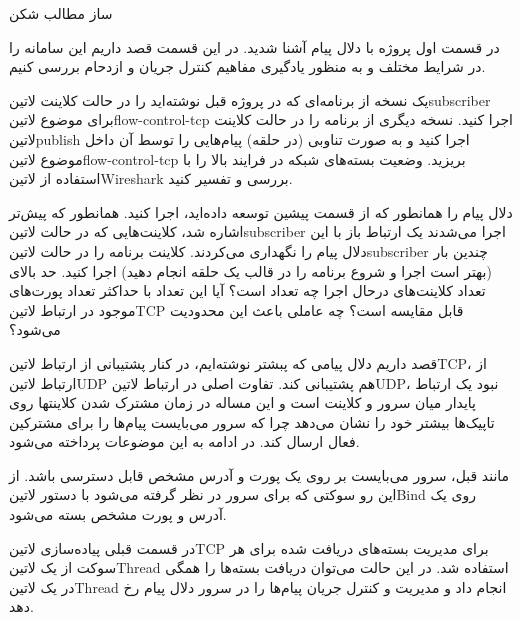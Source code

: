 \documentclass[]{article}
\begin{document}
  ‌ساز
  ‌مطالب
  ‌شکن


  در قسمت اول پروژه با دلال پیام آشنا شدید. در این قسمت قصد داریم این سامانه را در شرایط مختلف
  و به منظور یادگیری مفاهیم کنترل جریان و ازدحام بررسی کنیم.


   یک نسخه از برنامه‌ای که در پروژه قبل نوشته‌اید را در حالت کلاینت ‌لاتین{subscriber} برای موضوع ‌لاتین{flow-control-tcp} اجرا کنید.
   نسخه دیگری از برنامه را در حالت کلاینت ‌لاتین{publish} اجرا کنید و به صورت تناوبی (در حلقه) پیام‌هایی را توسط آن داخل موضوع ‌لاتین{flow-control-tcp} بریزید.
   وضعیت بسته‌های شبکه در فرایند بالا را با استفاده از ‌لاتین{Wireshark} بررسی و تفسیر کنید.


  دلال پیام را همانطور که از قسمت پیشین توسعه داده‌اید، اجرا کنید. همانطور که پیش‌تر اشاره شد، کلاینت‌هایی که در حالت ‌لاتین{subscriber} اجرا می‌شدند
  یک ارتباط باز با این دلال پیام را نگهداری می‌کردند.
  کلاینت برنامه را در حالت ‌لاتین{subscriber} چندین بار (بهتر است اجرا و شروع برنامه را در قالب یک حلقه انجام دهید) اجرا کنید.
  حد بالای تعداد کلاینت‌های درحال اجرا چه تعداد است؟
  آیا این تعداد با حداکثر تعداد
  پورت‌های موجود در ارتباط ‌لاتین{TCP} قابل مقایسه است؟ چه عاملی باعث این محدودیت می‌شود؟


  قصد داریم دلال پیامی که پبشتر نوشته‌ایم، در کنار پشتیبانی از ارتباط ‌لاتین{TCP}، از ارتباط ‌لاتین{UDP} هم پشتیبانی کند.
  تفاوت اصلی در ارتباط ‌لاتین{UDP}، نبود یک ارتباط پایدار میان سرور و کلاینت است و این مساله در زمان مشترک شدن
  کلاینتها روی تاپیک‌ها بیشتر خود را نشان می‌دهد چرا که سرور می‌بایست پیام‌ها را برای مشترکین فعال ارسال کند.
  در ادامه به این موضوعات پرداخته می‌شود.



  مانند قبل، سرور می‌بایست بر روی یک پورت و آدرس مشخص قابل دسترسی باشد. از این رو سوکتی که برای سرور در نظر گرفته می‌شود
  با دستور ‌لاتین{Bind} روی یک آدرس و پورت مشخص بسته می‌شود.

  در قسمت قبلی پیاده‌سازی ‌لاتین{TCP} برای مدیریت بسته‌های دریافت شده برای هر سوکت از یک ‌لاتین{Thread} استفاده شد.
  در این حالت می‌توان دریافت بسته‌ها را همگی در یک ‌لاتین{Thread} انجام داد و مدیریت و کنترل جریان پیام‌ها را در سرور دلال پیام رخ دهد.
\end{document}
